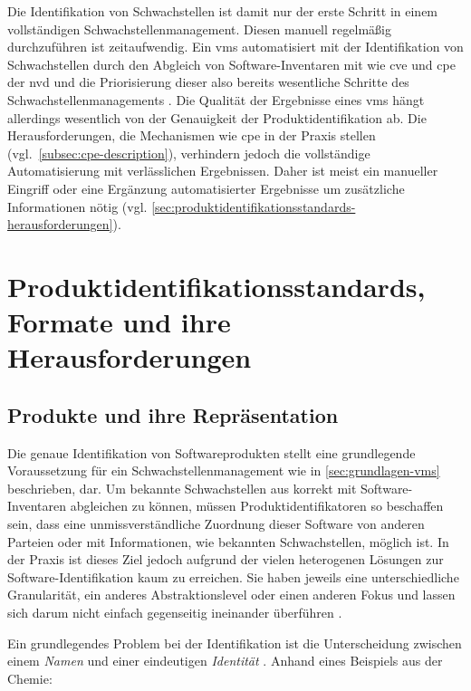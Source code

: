 Die Identifikation von Schwachstellen ist damit nur der erste Schritt in einem vollständigen Schwachstellenmanagement.
Diesen manuell regelmäßig durchzuführen ist zeitaufwendig.
Ein \acrshort{vms} automatisiert mit der Identifikation von Schwachstellen durch den Abgleich von Software-Inventaren mit  wie \acrshort{cve} und \acrshort{cpe} der \acrshort{nvd} und die Priorisierung dieser also bereits wesentliche Schritte des Schwachstellenmanagements \autocite{Idrissi_Sebai_Faroukhi_Mahouachi_2024}.
Die Qualität der Ergebnisse eines \acrshort{vms} hängt allerdings wesentlich von der Genauigkeit der Produktidentifikation ab.
Die Herausforderungen, die Mechanismen wie \acrshort{cpe} in der Praxis stellen (vgl.\ \autoref{subsec:cpe-description}), verhindern jedoch die vollständige Automatisierung mit verlässlichen Ergebnissen.
Daher ist meist ein manueller Eingriff oder eine Ergänzung automatisierter Ergebnisse um zusätzliche Informationen nötig (vgl. \autoref{sec:produktidentifikationsstandards-herausforderungen}).


\section{Produktidentifikationsstandards, Formate und ihre Herausforderungen}\label{sec:produktidentifikationsstandards-herausforderungen}

\subsection{Produkte und ihre Repräsentation}\label{subsec:produkte-vs-reprasentation}

Die genaue Identifikation von Softwareprodukten stellt eine grundlegende Voraussetzung für ein Schwachstellenmanagement wie in \autoref{sec:grundlagen-vms} beschrieben, dar.
Um bekannte Schwachstellen aus  korrekt mit Software-Inventaren abgleichen zu können, müssen Produktidentifikatoren so beschaffen sein, dass eine unmissverständliche Zuordnung dieser Software von anderen Parteien oder mit Informationen, wie bekannten Schwachstellen, möglich ist.
In der Praxis ist dieses Ziel jedoch aufgrund der vielen heterogenen Lösungen zur Software-Identifikation kaum zu erreichen.
Sie haben jeweils eine unterschiedliche Granularität, ein anderes Abstraktionslevel oder einen anderen Fokus und lassen sich darum nicht einfach gegenseitig ineinander überführen \autocite{CISA2023}.

Ein grundlegendes Problem bei der Identifikation ist die Unterscheidung zwischen einem \textit{Namen} und einer eindeutigen \textit{Identität} \autocite{Manion_Proell_Schmidt2023}.
Anhand eines Beispiels aus der Chemie:

